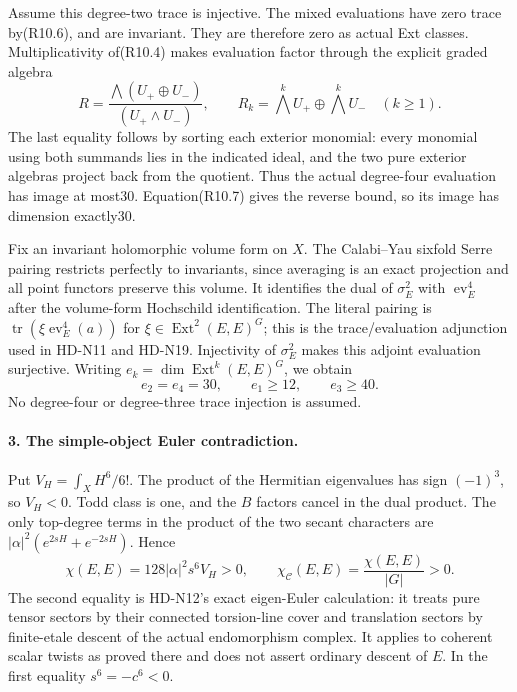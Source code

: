 Assume this degree-two trace is injective. The mixed evaluations
have zero trace by(R10.6), and are invariant. They are therefore
zero as actual Ext classes. Multiplicativity of(R10.4) makes
evaluation factor through the explicit graded algebra
\[
 R=\frac{\bigwedge(U_+\oplus U_-)}{(U_+\wedge U_-)},
 \qquad R_k=\bigwedge^kU_+\oplus\bigwedge^kU_-
                                      \quad(k\ge1).
                                                               \tag{R10.8}
\]
The last equality follows by sorting each exterior monomial:
every monomial using both summands lies in the indicated ideal,
and the two pure exterior algebras project back from the quotient.
Thus the actual degree-four evaluation has image at most30.
Equation(R10.7) gives the reverse bound, so its image has
dimension exactly30.

Fix an invariant holomorphic volume form on $X$. The
Calabi--Yau sixfold Serre pairing restricts perfectly to
invariants, since averaging is an exact projection and all point
functors preserve this volume. It identifies the dual of
$\sigma_E^2$ with $\operatorname{ev}_E^4$ after the volume-form
Hochschild identification. The literal pairing is
$\operatorname{tr}(\xi\operatorname{ev}_E^4(a))$ for
$\xi\in\operatorname{Ext}^2(E,E)^G$; this is the trace/evaluation
adjunction used in HD-N11 and HD-N19. Injectivity of
$\sigma_E^2$ makes this adjoint evaluation surjective. Writing
$e_k=\dim\operatorname{Ext}^k(E,E)^G$, we obtain
\[
               e_2=e_4=30,\qquad e_1\ge12,\qquad e_3\ge40.
                                                               \tag{R10.9}
\]
No degree-four or degree-three trace injection is assumed.

\paragraph{3. The simple-object Euler contradiction.}
Put $V_H=\int_XH^6/6!$. The product of the Hermitian eigenvalues
has sign $(-1)^3$, so $V_H<0$. Todd class is one, and the $B$
factors cancel in the dual product. The only top-degree terms
in the product of the two secant characters are
$|\alpha|^2(e^{2sH}+e^{-2sH})$. Hence
\[
 \chi(E,E)=128|\alpha|^2s^6V_H>0,
 \qquad
       \chi_{\mathcal C}(E,E)=\frac{\chi(E,E)}{|G|}>0.
                                                               \tag{R10.10}
\]
The second equality is HD-N12's exact eigen-Euler calculation:
it treats pure tensor sectors by their connected torsion-line
cover and translation sectors by finite-etale descent of the
actual endomorphism complex. It applies to coherent scalar
twists as proved there and does not assert ordinary descent of
$E$. In the first equality $s^6=-c^6<0$.

